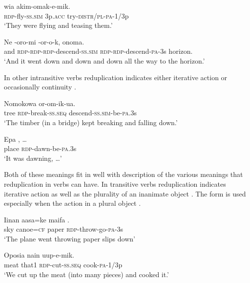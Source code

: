 \ea%
\label{ex:3:x218}
\gll {} wia akim-omak-e-mik. \\
\textsc{rdp}-fly-\textsc{ss}.\textsc{sim} 3p.\textsc{acc} try-\textsc{distr}/\textsc{pl}-\textsc{pa}-1/3p \\
\glt`They were flying and teasing them.' 
\z

\ea%
\label{ex:3:x216}
\gll Ne -oro-mi -or-o-k, onoma.\\
and \textsc{rdp}-\textsc{rdp}-\textsc{rdp}-descend-\textsc{ss}.\textsc{sim} \textsc{rdp}-\textsc{rdp}-descend-\textsc{pa}-3s horizon.\\
\glt`And it went down and down and down all the way to the horizon.'
\z

In other intransitive verbs reduplication indicates either iterative action  or occasionally continuity .

\ea%
\label{ex:3:x217}
\gll Nomokowa  or-om-ik-ua. \\
tree \textsc{rdp}-break-\textsc{ss}.\textsc{seq} descend-\textsc{ss}.\textsc{sim}-be-\textsc{pa}.3s\\
\glt`The timber (in a bridge) kept breaking and falling down.' 
\z

\ea%
\label{ex:3:x692}
\gll Epa , {\dots} \\
place \textsc{rdp}-dawn-be-\textsc{pa}.3s\\
\glt`It was dawning, {\dots}'
\z

Both of these meanings fit in well with  description of the various meanings that reduplication in verbs can have. In transitive verbs reduplication indicates iterative action as well as the plurality of an inanimate object . The form is used especially when the action  in a plural object .

\ea%
\label{ex:3:x219}
\gll Iinan aasa=ke maifa . \\
sky canoe=\textsc{cf} paper \textsc{rdp}-throw-go-\textsc{pa}-3s \\
\glt`The plane went throwing paper slips down' 
\z

\ea%
\label{ex:3:x220}
\gll Oposia nain  uup-e-mik. \\
meat that1 \textsc{rdp}-cut-\textsc{ss}.\textsc{seq} cook-\textsc{pa}-1/3p \\
\glt`We cut up the meat (into many pieces) and cooked it.'
\z

